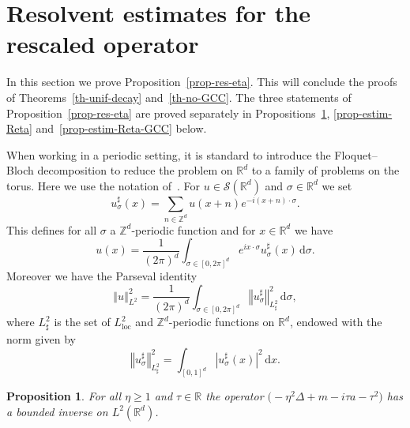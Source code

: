 \documentclass[11pt]{article}
\newtheorem{prop}[theo]{Proposition}
\theoremstyle{definition}
\numberwithin{equation}{section}
\numberwithin{figure}{section}
\numberwithin{table}{section}
\newcommand{\abs}[1]{\left\vert #1\right\vert}
\newcommand{\nr}[1]{\left\Vert #1\right\Vert}
\renewcommand{\geq}{\geqslant}
\newcommand{\1}{\mathds 1}
\newcommand{\loc}{{\mathrm{loc}}}
\newcommand{\R}{\mathbb{R}}
\newcommand{\D}{\Delta}
\newcommand{\s}{\sigma}
\renewcommand{\t}{\tau}
\newcommand{\Sc}{{\mathcal S}}
\newcommand{\dd}{\mathrm{d}}
\newcommand{\dx}{\dd x}
\newcommand{\dsigma}{\dd \sigma}
\begin{document}
\section{Resolvent estimates for the rescaled operator} \label{sec-resolvent-L2}

In this section we prove Proposition~\ref{prop-res-eta}. This will conclude the proofs of Theorems~\ref{th-unif-decay} and~\ref{th-no-GCC}. The three statements of Proposition~\ref{prop-res-eta} are proved separately in Propositions~\ref{prop-Reta-existence}, \ref{prop-estim-Reta} and~\ref{prop-estim-Reta-GCC} below.%

When working in a periodic setting, it is standard to introduce the Floquet--Bloch decomposition to reduce the problem on $\R^d$ to a family of problems on the torus. Here we use the notation of~\cite{JolyRo18}. For $u \in \Sc(\R^d)$ and $\s \in \R^d$ we set
\[
u^\sharp_\s (x) = \sum_{n \in \mathbb Z^d} u(x + n) e^{-i(x+n)\cdot \s}.
\]
This defines for all $\s$ a $\mathbb Z^d$-periodic function and for $x \in \R^d$ we have
\[
u(x) = \frac 1 {(2\pi)^d} \int_{\s \in [0,2\pi]^d} e^{ix\cdot \s} u^\sharp_\s(x) \, \dsigma.
\]
Moreover we have the Parseval identity
\[
\nr{u}_{L^2}^2 = \frac 1 {(2\pi)^d} \int_{\s \in [0,2\pi]^d} \nr{u_\s^\sharp}_{L^2_\sharp}^2 \, \dsigma,
\]
where $L^2_\sharp$ is the set of $L^2_\loc$ and $\mathbb Z^d$-periodic functions on $\R^d$, endowed with the norm given by
\[
\nr{u_\s^\sharp}_{L^2_\sharp}^2 = \int_{[0,1]^d} \abs{u_\s^\sharp(x)}^2 \, \dx.
\]

\begin{prop}\label{prop-Reta-existence}
For all $\eta \geq 1$ and $\t \in \R$ the operator $\big(-\eta^2 \D + m - i\t a - \t^2 \big)$ has a bounded inverse on $L^2(\R^d)$.
\end{prop}
\end{document}
